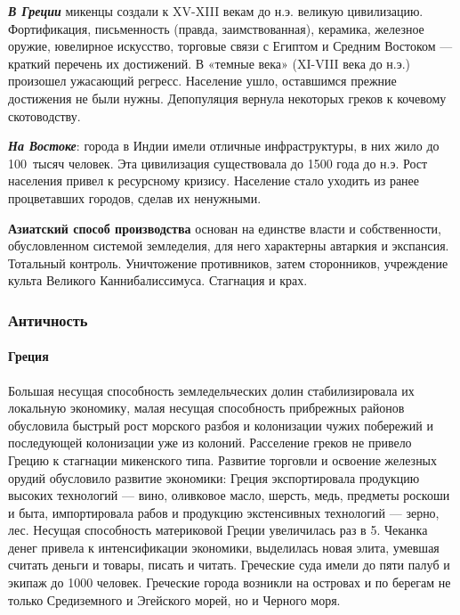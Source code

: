 \textbf{\textit{В Греции}} микенцы создали к \foreignlanguage{english}{XV}{}-\foreignlanguage{english}{XIII} векам до
н.э. великую цивилизацию. Фортификация, письменность (правда, заимствованная), керамика, железное оружие, ювелирное
искусство, торговые связи с Египтом и Средним Востоком — краткий перечень их достижений. В «темные века»
(\foreignlanguage{english}{XI}{}-\foreignlanguage{english}{VIII} века до н.э.) произошел ужасающий регресс. Население
ушло, оставшимся прежние достижения не были нужны. Депопуляция вернула некоторых греков к кочевому скотоводству.

\textbf{\textit{На Востоке}}: города в Индии имели отличные инфраструктуры, в них жило до 100~тысяч человек. Эта
цивилизация существовала до 1500 года до н.э. Рост населения привел к ресурсному кризису. Население стало уходить из
ранее процветавших городов, сделав их ненужными.

\textbf{Азиатский способ производства} основан на единстве власти и собственности, обусловленном системой земледелия,
для него характерны автаркия и экспансия. Тотальный контроль. Уничтожение противников, затем сторонников, учреждение
культа Великого Каннибалиссимуса. Стагнация и крах.

\subsubsection[Античность]{Античность}
\paragraph[Греция ]{Греция }
Большая несущая способность земледельческих долин стабилизировала их локальную экономику, малая несущая способность
прибрежных районов обусловила быстрый рост морского разбоя и колонизации чужих побережий и последующей колонизации уже
из колоний. Расселение греков не привело Грецию к стагнации микенского типа. Развитие торговли и освоение железных
орудий обусловило развитие экономики: Греция экспортировала продукцию высоких технологий — вино, оливковое масло,
шерсть, медь, предметы роскоши и быта, импортировала рабов и продукцию экстенсивных технологий — зерно, лес. Несущая
способность материковой Греции увеличилась раз в 5. Чеканка денег привела к интенсификации экономики, выделилась новая
элита, умевшая считать деньги и товары, писать и читать. Греческие суда имели до пяти палуб и экипаж до 1000 человек.
Греческие города возникли на островах и по берегам не только Средиземного и Эгейского морей, но и Черного моря.

